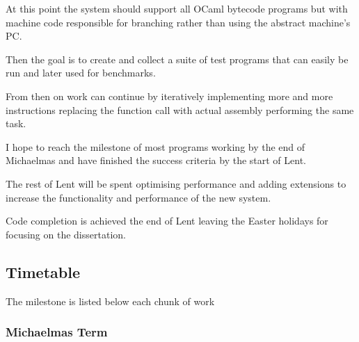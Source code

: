 \documentclass[12pt,a4paper, headings=standardclasses]{scrartcl}
\begin{document}
At this point the system should support all OCaml bytecode programs but with
machine code responsible for branching rather than using the abstract
machine's PC.

Then the goal is to create and collect a suite of test programs that can
easily be run and later used for benchmarks.

From then on work can continue by iteratively implementing more and more
instructions replacing the function call with actual assembly performing the
same task.

I hope to reach the milestone of most programs working by the end of Michaelmas
and have finished the success criteria by the start of Lent.

The rest of Lent will be spent optimising performance and adding extensions to
increase the functionality and performance of the new system.

Code completion is achieved the end of Lent leaving the Easter holidays for
focusing on the dissertation.

\subsection*{Timetable}

The milestone is listed below each chunk of work

\subsubsection*{Michaelmas Term} 
\end{document}
